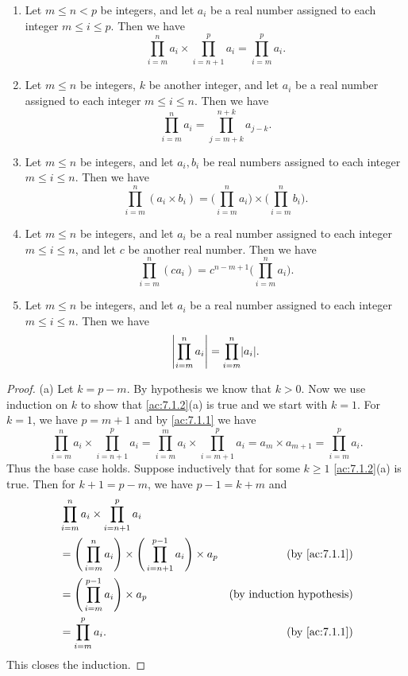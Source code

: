 \begin{ac}\label{ac:7.1.2}
  \mbox{}
  \begin{enumerate}
    \item Let \(m \leq n < p\) be integers, and let \(a_i\) be a real number assigned to each integer \(m \leq i \leq p\).
          Then we have
          \[
            \prod_{i = m}^n a_i \times \prod_{i = n + 1}^p a_i = \prod_{i = m}^p a_i.
          \]
    \item Let \(m \leq n\) be integers, \(k\) be another integer, and let \(a_i\) be a real number assigned to each integer \(m \leq i \leq n\).
          Then we have
          \[
            \prod_{i = m}^n a_i = \prod_{j = m + k}^{n + k} a_{j - k}.
          \]
    \item Let \(m \leq n\) be integers, and let \(a_i, b_i\) be real numbers assigned to each integer \(m \leq i \leq n\).
          Then we have
          \[
            \prod_{i = m}^n (a_i \times b_i) = \Bigg(\prod_{i = m}^n a_i\Bigg) \times \Bigg(\prod_{i = m}^n b_i\Bigg).
          \]
    \item Let \(m \leq n\) be integers, and let \(a_i\) be a real number assigned to each integer \(m \leq i \leq n\), and let \(c\) be another real number.
          Then we have
          \[
            \prod_{i = m}^n (ca_i) = c^{n - m + 1} \Bigg(\prod_{i = m}^n a_i\Bigg).
          \]
    \item Let \(m \leq n\) be integers, and let \(a_i\) be a real number assigned to each integer \(m \leq i \leq n\).
          Then we have
          \[
            \abs{\prod_{i = m}^n a_i} = \prod_{i = m}^n \abs{a_i}.
          \]
  \end{enumerate}
\end{ac}

\begin{proof}{(a)}
  Let \(k = p - m\).
  By hypothesis we know that \(k > 0\).
  Now we use induction on \(k\) to show that \cref{ac:7.1.2}(a) is true and we start with \(k = 1\).
  For \(k = 1\), we have \(p = m + 1\) and by \cref{ac:7.1.1} we have
  \[
    \prod_{i = m}^n a_i \times \prod_{i = n + 1}^p a_i = \prod_{i = m}^m a_i \times \prod_{i = m + 1}^p a_i = a_m \times a_{m + 1} = \prod_{i = m}^p a_i.
  \]
  Thus the base case holds.
  Suppose inductively that for some \(k \geq 1\) \cref{ac:7.1.2}(a) is true.
  Then for \(k + 1 = p - m\), we have \(p - 1 = k + m\) and
  \begin{align*}
     & \prod_{i = m}^n a_i \times \prod_{i = n + 1}^p a_i                                                                               \\
     & = \Bigg(\prod_{i = m}^n a_i\Bigg) \times \Bigg(\prod_{i = n + 1}^{p - 1} a_i\Bigg) \times a_p & \text{(by \cref{ac:7.1.1})}      \\
     & = \Bigg(\prod_{i = m}^{p - 1} a_i\Bigg) \times a_p                                            & \text{(by induction hypothesis)} \\
     & = \prod_{i = m}^p a_i.                                                                        & \text{(by \cref{ac:7.1.1})}
  \end{align*}
  This closes the induction.
\end{proof}

